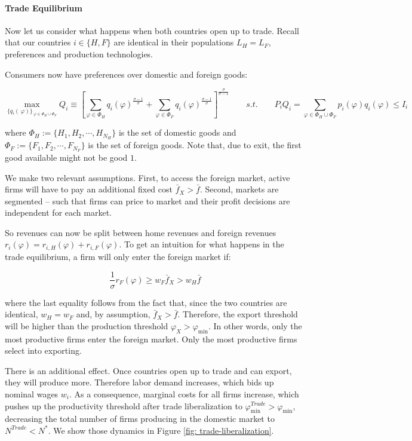 \documentclass[11pt,letterpaper]{article}
\begin{document}
\paragraph{Trade Equilibrium} Now let us consider what happens when both countries open up to trade. Recall that our countries $i \in \{H,F \}$ are identical in their populations $L_H=L_F$, preferences and production technologies. 

Consumers now have preferences over domestic and foreign goods:

\begin{equation*}
    \max_{\{q_i(\
\varphi)\}_{\
\varphi \in \Phi_H \cup \Phi_F}} Q_i \equiv \left[ \sum_{\varphi \in \Phi_H } q_i(
\varphi)^{\tfrac{\sigma-1}{\sigma}} +\sum_{\varphi \in \Phi_F } q_i(
\varphi)^{\tfrac{\sigma-1}{\sigma}} \right]^{\tfrac{\sigma}{\sigma-1} } \qquad s.t. \qquad  P_i Q_i =\sum_{\varphi \in \Phi_H \cup \Phi_F } p_i(\varphi) q_i(\varphi) \le I_i 
\end{equation*}

\noindent where $\Phi_H := \{ H_1, H_2, \cdots,H_{N_H} \}$ is the set of domestic goods and $\Phi_F := \{ F_1, F_2, \cdots,F_{N_F} \}$ is the set of foreign goods. Note that, due to exit, the first good available might not be good $1$.

We make two relevant assumptions. First, to access the foreign market, active firms will have to pay an additional fixed cost $\bar{f}_X>\bar{f}$. Second, markets are segmented -- such that firms can price to market and their profit decisions are independent for each market.  

So revenues can now be split between home revenues and foreign revenues $r_i(\varphi)=r_{i,H}(\varphi) + r_{i,F}(\varphi)$. To get an intuition for what happens in the trade equilibrium, a firm will only enter the foreign market if:

\begin{equation*}
\frac{1}{\sigma} r_F(\varphi)\ge w_F \bar{f}_X > w_H \bar{f}    
\end{equation*}

\noindent where the last equality follows from the fact that, since the two countries are identical, $w_H=w_F$ and, by assumption, $\bar{f}_X>\bar{f}$. Therefore, the export threshold will be higher than the production threshold $\varphi_X > \varphi_{\min}$. In other words, only the most productive firms enter the foreign market. Only the most productive firms select into exporting.

There is an additional effect. Once countries open up to trade and can export, they will produce more. Therefore labor demand increases, which bids up nominal wages $w_i$. As a consequence, marginal costs for all firms increase, which pushes up the productivity threshold after trade liberalization to $\varphi_{\min}^{Trade}>\varphi_{\min}$, decreasing the total number of firms producing in the domestic market to $N^{Trade}<N^*$. We show those dynamics in Figure \ref{fig: trade-liberalization}.
\end{document}
